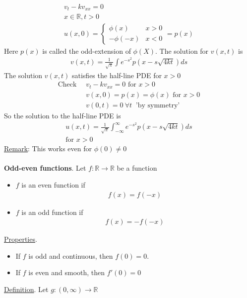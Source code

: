 \documentclass[12pt, letterpaper]{article}
\begin{document}
\begin{align*}
    v_t - kv_{xx} = 0 \\
    x\in \mathbb{R}, t > 0 \\
    u(x,0) = \begin{cases}
        \phi(x) & x > 0 \\
        -\phi(-x) & x < 0
    \end{cases} = p(x)
\end{align*} 
Here $p(x)$ is called the odd-extension of $\phi(X)$. The solution for $v(x,t)$ is
\begin{align*}
    v(x,t) = \frac{1}{\sqrt{\pi}} \int e^{-s^2}p(x-s\sqrt{4kt})ds
\end{align*}
The solution $v(x,t)$ satisfies the half-line PDE for $x > 0$
\begin{align*}
    \text{Check }\ &v_t - kv_{xx} = 0 \text{ for } x > 0\\
    &v(x,0) = p(x) = \phi(x) \text{ for }x > 0 \\
    &v(0,t) = 0 \ \forall t\ \text{ 'by symmetry'}
\end{align*}
So the solution to the half-line PDE is 
\begin{align*}
    u(x,t) = \frac{1}{\sqrt{\pi}} \int_{-\infty}^{\infty} e^{-s^2}p(x-s\sqrt{4kt})ds \\
    \text{for } x > 0
\end{align*}
\underline{Remark}: This works even for $\phi(0) \ne 0$ \\ \\
\textbf{Odd-even functions}. Let $f:\mathbb{R} \rightarrow \mathbb{R}$ be a function 
\begin{itemize}
    \item $f$ is an even function if 
    \begin{align*}
        f(x) = f(-x)
    \end{align*} 
    \item $f$ is an odd function if 
    \begin{align*}
        f(x) = -f(-x)
    \end{align*}
\end{itemize}
\underline{Properties}.
\begin{itemize}
    \item If $f$ is odd and continuous, then $f(0) = 0$.
    \item If $f$ is even and smooth, then $f'(0) = 0$
\end{itemize}
\underline{Definition}. Let $g:(0,\infty) \rightarrow \mathbb{R}$
\end{document}
